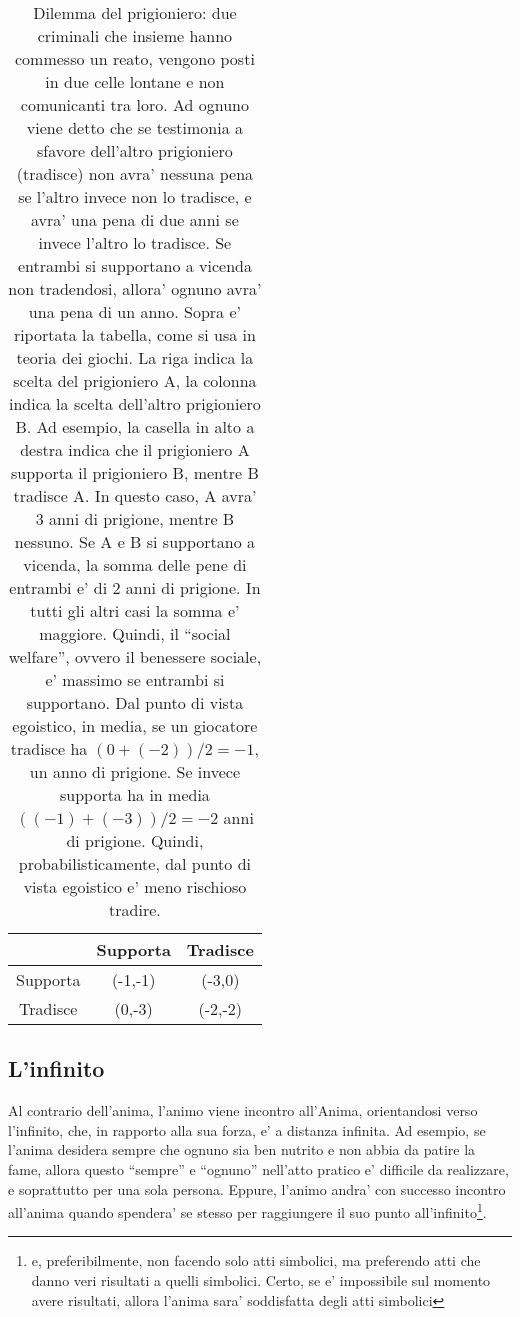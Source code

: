 \begin{center}
    \begin{table}
        \begin{tabular}{ |c|c|c| }
            \hline
            &  Supporta   &   Tradisce \\
            \hline
            Supporta   & (-1,-1) & (-3,0) \\
            \hline
            Tradisce & (0,-3) & (-2,-2) \\
            \hline
        \end{tabular}
        \caption{\label{tabPrisonerDilemma}Dilemma del prigioniero: due criminali che insieme hanno commesso un reato, vengono posti in due celle lontane e non comunicanti tra loro. Ad ognuno viene detto che se testimonia a sfavore dell'altro prigioniero (tradisce) non avra' nessuna pena se l'altro invece non lo tradisce, e avra' una pena di due anni se invece l'altro lo tradisce. Se entrambi si supportano a vicenda non tradendosi, allora' ognuno avra' una pena di un anno. Sopra e' riportata la tabella, come si usa in teoria dei giochi. La riga indica la scelta del prigioniero A, la colonna indica la scelta dell'altro prigioniero B. Ad esempio, la casella in alto a destra indica che il prigioniero A supporta il prigioniero B, mentre B tradisce A. In questo caso, A avra' 3 anni di prigione, mentre B nessuno. Se A e B si supportano a vicenda, la somma delle pene di entrambi e' di 2 anni di prigione. In tutti gli altri casi la somma e' maggiore. Quindi, il ``social welfare'', ovvero il benessere sociale, e' massimo se entrambi si supportano. Dal punto di vista egoistico, in media, se un giocatore tradisce ha $(0+(-2))/2 = -1$, un anno di prigione. Se invece supporta ha in media $((-1)+(-3))/2=-2$ anni di prigione. Quindi, probabilisticamente, dal punto di vista egoistico e' meno rischioso tradire. }

    \end{table}
\end{center}



\subsection{L'infinito}

Al contrario dell'anima, l'animo viene incontro all'Anima, orientandosi verso l'infinito, che, in rapporto alla sua forza, e' a distanza infinita. Ad esempio, se l'anima desidera sempre che ognuno sia ben nutrito e non abbia da patire la fame, allora questo ``sempre'' e ``ognuno'' nell'atto pratico e' difficile da realizzare, e soprattutto per una sola persona. Eppure, l'animo andra' con successo incontro all'anima quando spendera' se stesso per raggiungere il suo punto all'infinito\footnote{e, preferibilmente, non facendo solo atti simbolici, ma preferendo atti che danno veri risultati a quelli simbolici. Certo, se e' impossibile sul momento avere risultati, allora l'anima sara' soddisfatta degli atti simbolici}.


